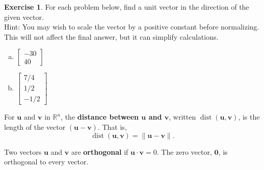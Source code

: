 \documentclass[10pt]{book}
\newcommand{\boxcolor}{gray!30}
\newenvironment{boxdef}{\begin{mdframed}[backgroundcolor=\boxcolor,linewidth=0pt,nobreak=true]}{\end{mdframed}}
\theoremstyle{definition}
\newtheorem{exercise}{Exercise}[section]
\newcommand{\R}{\mathbb{R}}
\newcommand{\vect}[1]{\ensuremath{\boldsymbol{\mathbf{#1}}}}
\DeclareMathOperator{\dist}{dist}
\begin{document}
\begin{exercise} %
	For each problem below, find a unit vector in the direction of the given vector. \\
	Hint: You may wish to scale the vector by a positive constant before normalizing. This will not affect the final answer, but it can simplify calculations.
	\begin{multicols}{2}
		\begin{enumerate}[(a)]
			\item $\begin{bmatrix}-30\\40\end{bmatrix}$
			\columnbreak
			\item $\begin{bmatrix}7/4\\1/2\\-1/2\end{bmatrix}$
		\end{enumerate}
	\end{multicols}
\end{exercise}
\vfill


\newpage


\begin{boxdef}
	For $\vect{u}$ and $\vect{v}$ in $\R^n$, the \textbf{distance between $\boldsymbol{\vect{u}}$ and $\boldsymbol{\vect{v}}$}, written $\dist(\vect{u},\vect{v})$, is the length of the vector $(\vect{u}-\vect{v})$. That is,
	\vspace{-1ex}
	$$ \dist(\vect{u},\vect{v}) = \| \vect{u}-\vect{v} \|. $$
\end{boxdef}
\vspace{-1em}
\begin{boxdef}
	Two vectors $\vect{u}$ and $\vect{v}$ are \textbf{orthogonal} if $\vect{u}\cdot\vect{v}=0$. The zero vector, $\vect{0}$, is orthogonal to every vector.
\end{boxdef}
\end{document}

